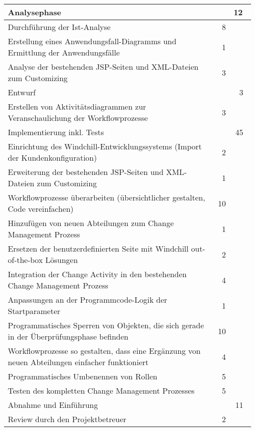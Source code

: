 \begin{tabularx}{\textwidth}{Xrr}
    \rowcolor{heading} Analysephase &  & 12\  \\ \hline
    Durchführung der Ist-Analyse & 8 &  \\ \hline
    \rowcolor{odd}Erstellung eines Anwendungsfall-Diagramms und Ermittlung der Anwendungsfälle & 1 &  \\ \hline
    Analyse der bestehenden JSP-Seiten und XML-Dateien zum Customizing & 3 &  \\ \hline
    \rowcolor{heading} Entwurf & & 3\  \\ \hline
    Erstellen von Aktivitätsdiagrammen zur Veranschaulichung der Workflowprozesse & 3 &  \\ \hline
    \rowcolor{heading} Implementierung inkl. Tests & & 45\  \\ \hline
    Einrichtung des Windchill-Entwicklungssystems (Import der Kundenkonfiguration) & 2 &  \\ \hline
    \rowcolor{odd}Erweiterung der bestehenden JSP-Seiten und XML-Dateien zum Customizing & 1 &  \\ \hline
    Workflowprozesse überarbeiten (übersichtlicher gestalten, Code vereinfachen) & 10 &  \\ \hline
    \rowcolor{odd}Hinzufügen von neuen Abteilungen zum Change Management Prozess & 1 &  \\ \hline
    Ersetzen der benutzerdefinierten Seite mit Windchill out-of-the-box Lösungen & 2 &  \\ \hline
    \rowcolor{odd}Integration der Change Activity in den bestehenden Change Management Prozess & 4 &  \\ \hline
    Anpassungen an der Programmcode-Logik der Startparameter & 1 &  \\ \hline
    \rowcolor{odd}Programmatisches Sperren von Objekten, die sich gerade in der Überprüfungsphase befinden & 10 &  \\ \hline
    Workflowprozesse so gestalten, dass eine Ergänzung von neuen Abteilungen einfacher funktioniert & 4 &  \\ \hline
    \rowcolor{odd}Programmatisches Umbenennen von Rollen & 5 &  \\ \hline
    Testen des kompletten Change Management Prozesses & 5 &  \\ \hline
    \rowcolor{heading} Abnahme und Einführung & & 11\  \\ \hline
    Review durch den Projektbetreuer & 2 &  \\ \hline

\end{tabularx}

